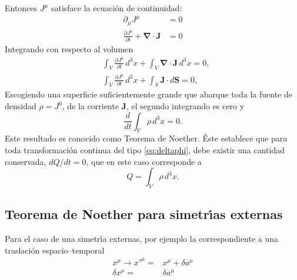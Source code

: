 Entonces $J^\mu$ satisface la ecuaci\'on de continuidad:
\begin{align}
  \label{eq:conti}
  \partial_\mu J^\mu&=0\\
\frac{\partial J^0}{\partial t}+\boldsymbol{\nabla}\cdot\mathbf{J}&=0
\end{align}
Integrando con respecto al volumen
\begin{align}
  &\int_V\frac{\partial J^0}{\partial t}\,d^3x+\int_V\boldsymbol{\nabla}\cdot\mathbf{J}\,d^3x=0,\nonumber\\
  &\int_V\frac{\partial J^0}{\partial t}\,d^3x+\int_S\mathbf{J}\cdot d\mathbf{S}=0,
\end{align}
Escogiendo una superficie suficientemente grande que abarque toda la fuente de densidad $\rho=J^0$, de la corriente $\mathbf{J}$, el segundo integrando es cero y
\begin{equation}
  \frac{d}{dt}\int_V\rho\,d^3x=0.
\end{equation}
Este resultado es conocido como Teorema de Noether. \'Este establece que para
toda transformaci\'on continua del tipo \eqref{eq:deltaphi}, debe
existir una cantidad conservada, $dQ/dt=0$, que en este caso corresponde a
\begin{equation}
  \label{eq:qcons}
  Q=\int_V \rho\,d^3x.
\end{equation}
\subsection{Teorema de Noether para simetr\'\i as externas}
Para el caso de una simetr\'\i a externas, por ejemplo la correspondiente a una traslaci\'on espacio--temporal
\begin{align}
  x^\mu\to{x'}^\mu=&x^\mu+\delta a^\mu\nonumber\\
  \delta x^\mu=&\delta a^\mu
\end{align}

